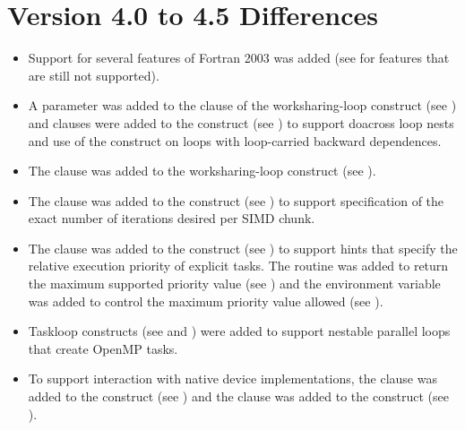 \section{Version 4.0 to 4.5 Differences}
\label{sec:Version 4.0 to 4.5 Differences}
\begin{itemize}
\item Support for several features of Fortran 2003 was added (see
       for features that are still
      not supported).

\item A parameter was added to the  clause of the worksharing-loop 
      construct (see ) and clauses 
      were added to the  construct 
      (see ) to support doacross loop nests 
      and use of the  construct on loops with loop-carried backward 
      dependences.

\item The  clause was added to the worksharing-loop construct
      (see ).

\item The  clause was added to the  construct
      (see ) to support specification of
      the exact number of iterations desired per SIMD chunk.

\item The  clause was added to the  construct
      (see ) to support hints that specify
      the relative execution priority of explicit tasks. The
       routine was added to return
      the maximum supported priority value (see
      ) and the
       environment variable was added to
      control the maximum priority value allowed (see
      ).

\item Taskloop constructs (see  and
      ) were added to support
      nestable parallel loops that create OpenMP tasks.

\item To support interaction with native device implementations, the
       clause was added to the 
      construct (see ) and the
       clause was added to the  construct
      (see ).


\end{itemize}
